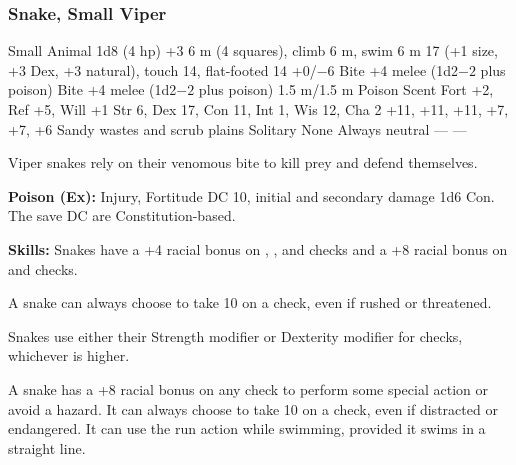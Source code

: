 \subsubsection{Snake, Small Viper}
\begin{MonsterStats}
{Small Animal}
{1d8 (4 hp)}
{+3}
{6 m (4 squares), climb 6 m, swim 6 m}
{17 (+1 size, +3 Dex, +3 natural), touch 14, flat-footed 14}
{+0/$-6$}
{Bite +4 melee (1d2$-2$ plus poison)}
{Bite +4 melee (1d2$-2$ plus poison)}
{1.5 m/1.5 m}
{Poison}
{Scent}
{Fort +2, Ref +5, Will +1}
{Str 6, Dex 17, Con 11, Int 1, Wis 12, Cha 2}
{ +11,  +11,  +11,  +7,  +7,  +6}
{}
{Sandy wastes and scrub plains}
{Solitary}
{\onehalf}
{None}
{Always neutral}
{---}
{---}
\end{MonsterStats}


Viper snakes rely on their venomous bite to kill prey and defend themselves.

\textbf{Poison (Ex):} Injury, Fortitude DC 10, initial and secondary damage 1d6 Con. The save DC are Constitution-based.

\textbf{Skills:} Snakes have a +4 racial bonus on , , and  checks and a +8 racial bonus on  and  checks.

A snake can always choose to take 10 on a  check, even if rushed or threatened.

Snakes use either their Strength modifier or Dexterity modifier for  checks, whichever is higher.

A snake has a +8 racial bonus on any  check to perform some special action or avoid a hazard. It can always choose to take 10 on a  check, even if distracted or endangered. It can use the run action while swimming, provided it swims in a straight line.
